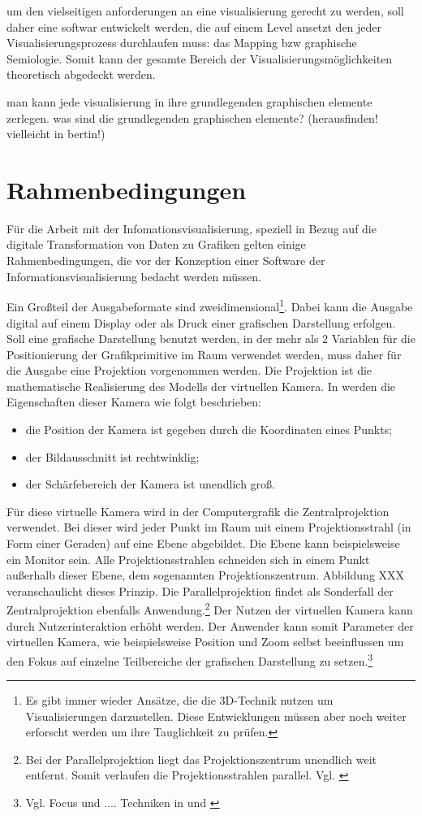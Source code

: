 \documentclass[a4paper, 12pt, DIVcalc, onepage, pdftex, headsepline, footsepline]{scrreprt}
\begin{document}
um den vielseitigen anforderungen an eine visualisierung gerecht zu werden, soll daher eine softwar entwickelt werden, die auf einem Level ansetzt den jeder Visualisierungsprozess durchlaufen muss: das Mapping bzw graphische Semiologie. Somit kann der gesamte Bereich der Visualisierungsmöglichkeiten theoretisch abgedeckt werden.

man kann jede visualisierung in ihre grundlegenden graphischen elemente zerlegen.
was sind die grundlegenden graphischen elemente? (herausfinden! vielleicht in bertin!)

\section{Rahmenbedingungen}
Für die Arbeit mit der Infomationsvisualisierung, speziell in Bezug auf die digitale
Transformation von Daten zu Grafiken gelten einige Rahmenbedingungen, die vor der
Konzeption einer Software der Informationsvisualisierung bedacht werden müssen.


Ein Großteil der Ausgabeformate sind zweidimensional\footnote{Es gibt immer wieder
Ansätze, die die 3D-Technik nutzen um Visualisierungen darzustellen. Diese Entwicklungen
müssen aber noch weiter erforscht werden um ihre Tauglichkeit zu prüfen.}. Dabei kann
die Ausgabe digital auf einem Display oder als Druck einer grafischen Darstellung
erfolgen. Soll eine grafische Darstellung benutzt werden, in der mehr als 2 Variablen
für die Positionierung der Grafikprimitive im Raum verwendet werden, muss daher für die
Ausgabe eine Projektion vorgenommen werden. Die Projektion ist die mathematische
Realisierung des Modells der virtuellen Kamera. In \citep[S.\,26]{Computergrafik} werden die 
Eigenschaften dieser Kamera wie folgt beschrieben:
\begin{itemize}
\item die Position der Kamera ist gegeben durch die Koordinaten eines Punkts;
\item der Bildausschnitt ist rechtwinklig;
\item der Schärfebereich der Kamera ist unendlich groß.
\end{itemize}
Für diese virtuelle Kamera wird in der Computergrafik die Zentralprojektion verwendet.
Bei dieser wird jeder Punkt im Raum mit einem Projektionsstrahl (in Form einer Geraden)
auf eine Ebene abgebildet. Die Ebene kann beispielsweise ein Monitor sein. Alle 
Projektionsstrahlen schneiden sich in einem Punkt außerhalb dieser Ebene, dem sogenannten
Projektionszentrum. Abbildung XXX veranschaulicht dieses Prinzip. Die Parallelprojektion
findet als Sonderfall der Zentralprojektion ebenfalls Anwendung.\footnote{Bei der
Parallelprojektion liegt das Projektionszentrum unendlich weit entfernt. Somit verlaufen
die Projektionsstrahlen parallel. Vgl. \citep{wiki_projektion}} Der Nutzen der virtuellen
Kamera kann durch Nutzerinteraktion erhöht werden. Der Anwender kann somit Parameter der
virtuellen Kamera, wie beispielsweise Position und Zoom selbst beeinflussen um den Fokus
auf einzelne Teilbereiche der grafischen Darstellung zu setzen.\footnote{Vgl. Focus und
.... Techniken in \citep[S.\,1]{Schumann} und \citep[S.\,1]{Preim}}
\end{document}
